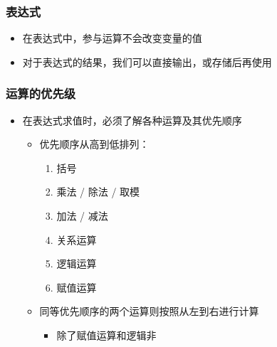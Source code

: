 \begin{frame}[fragile]
    \frametitle{表达式}

    \begin{itemize}
        \item 在表达式中，参与运算不会改变变量的值

        \item 对于表达式的结果，我们可以直接输出，或存储后再使用

             {
                 {
                    
                }{
                    
                }
            }
    \end{itemize}
\end{frame}

\begin{frame}[fragile]
    \frametitle{运算的优先级}

    \begin{itemize}
        \item 在表达式求值时，必须了解各种运算及其优先顺序

            \begin{itemize}
                \item 优先顺序从高到低排列：

                    \begin{multicols}{2}
                        \begin{enumerate}
                            \item 括号
                            \item 乘法 / 除法 / 取模
                            \item 加法 / 减法
                            \item 关系运算
                            \item 逻辑运算
                            \item 赋值运算
                        \end{enumerate}
                    \end{multicols}

                \item 同等优先顺序的两个运算则按照从左到右进行计算

                    \begin{itemize}
                        \item 除了赋值运算和逻辑非
                    \end{itemize}

            \end{itemize}

    \end{itemize}
\end{frame}


